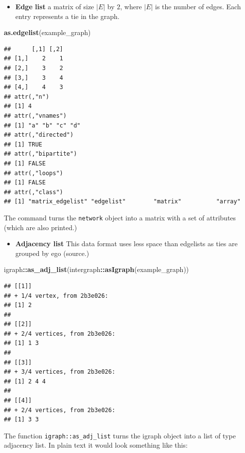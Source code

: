 \documentclass[
]{book}
\newenvironment{Shaded}{\begin{snugshade}}{\end{snugshade}}
\newcommand{\FunctionTok}[1]{\textcolor[rgb]{0.13,0.29,0.53}{\textbf{#1}}}
\newcommand{\NormalTok}[1]{#1}
\newcommand{\SpecialCharTok}[1]{\textcolor[rgb]{0.81,0.36,0.00}{\textbf{#1}}}
\providecommand{\tightlist}{%
  \setlength{\itemsep}{0pt}\setlength{\parskip}{0pt}}
\begin{document}
\begin{itemize}
\tightlist
\item
  \textbf{Edge list} a matrix of size \(|E|\) by \(2\), where \(|E|\) is the number of edges.
  Each entry represents a tie in the graph.
\end{itemize}

\begin{Shaded}
\begin{Highlighting}[]
\FunctionTok{as.edgelist}\NormalTok{(example\_graph)}
\end{Highlighting}
\end{Shaded}

\begin{verbatim}
##      [,1] [,2]
## [1,]    2    1
## [2,]    3    2
## [3,]    3    4
## [4,]    4    3
## attr(,"n")
## [1] 4
## attr(,"vnames")
## [1] "a" "b" "c" "d"
## attr(,"directed")
## [1] TRUE
## attr(,"bipartite")
## [1] FALSE
## attr(,"loops")
## [1] FALSE
## attr(,"class")
## [1] "matrix_edgelist" "edgelist"        "matrix"          "array"
\end{verbatim}

The command turns the \texttt{network} object into a matrix with a set of attributes
(which are also printed.)

\begin{itemize}
\tightlist
\item
  \textbf{Adjacency list} This data format uses less space than edgelists as ties are
  grouped by ego (source.)
\end{itemize}

\begin{Shaded}
\begin{Highlighting}[]
\NormalTok{igraph}\SpecialCharTok{::}\FunctionTok{as\_adj\_list}\NormalTok{(intergraph}\SpecialCharTok{::}\FunctionTok{asIgraph}\NormalTok{(example\_graph)) }
\end{Highlighting}
\end{Shaded}

\begin{verbatim}
## [[1]]
## + 1/4 vertex, from 2b3e026:
## [1] 2
## 
## [[2]]
## + 2/4 vertices, from 2b3e026:
## [1] 1 3
## 
## [[3]]
## + 3/4 vertices, from 2b3e026:
## [1] 2 4 4
## 
## [[4]]
## + 2/4 vertices, from 2b3e026:
## [1] 3 3
\end{verbatim}

The function \texttt{igraph::as\_adj\_list} turns the igraph object into a list of
type adjacency list. In plain text it would look something like this:
\end{document}
